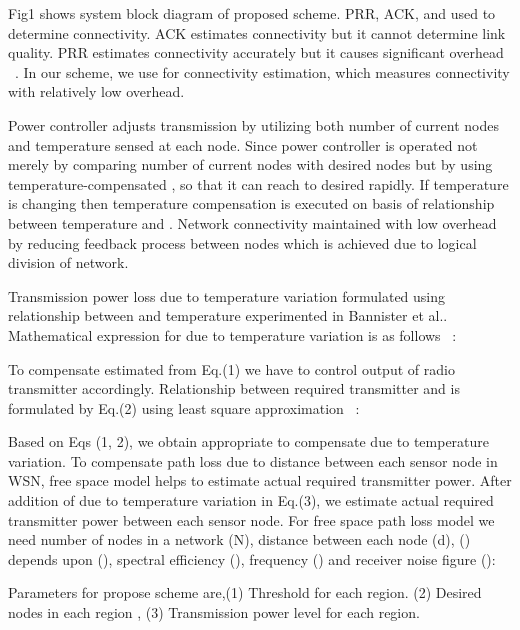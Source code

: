 \documentclass[12pt, conference, compsocconf, onecolumn, draftcls]{IEEEtran}
\begin{document}
Fig1 shows system block diagram of proposed scheme. PRR, ACK, and  used to determine connectivity. ACK estimates connectivity but it cannot determine link quality. PRR estimates connectivity accurately but it causes significant overhead ~\cite{8}. In our scheme, we use  for connectivity estimation, which measures connectivity with relatively low overhead.

Power controller adjusts transmission  by utilizing both number of current nodes and temperature sensed at each node. Since power controller is operated not merely by comparing number of current nodes with desired nodes but by using temperature-compensated , so that it can reach to desired  rapidly. If temperature is changing then temperature compensation is executed on basis of relationship between temperature and . Network connectivity maintained with low overhead by reducing feedback process between nodes which is achieved due to logical division of network.

Transmission power loss due to temperature variation formulated using relationship between  and temperature experimented in Bannister et al.. Mathematical expression for  due to temperature variation is as follows ~\cite{12}:



To compensate  estimated from Eq.(1) we have to control output  of radio transmitter accordingly. Relationship between required transmitter  and  is formulated by Eq.(2) using least square approximation ~\cite{12}:



Based on Eqs (1, 2), we obtain appropriate  to compensate  due to temperature variation. To compensate path loss due to distance  between each sensor node in WSN, free space model helps to estimate actual required transmitter power. After addition of  due to temperature variation in Eq.(3), we estimate actual required transmitter power between each sensor node. For free space path loss model  we need number of nodes in a network (N), distance between each node (d), () depends upon (), spectral efficiency (), frequency () and receiver noise figure ():
 

Parameters for propose scheme are,(1) Threshold   for each region. (2) Desired nodes in each region , (3) Transmission power level  for each region.
\end{document}
